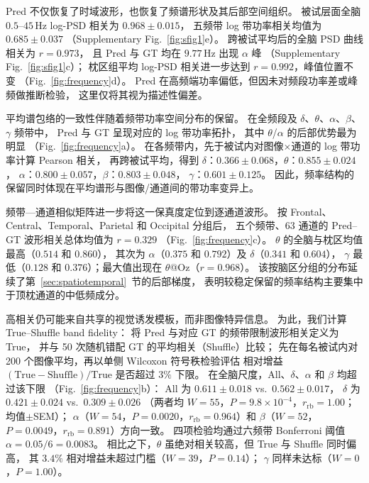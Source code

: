 \documentclass[a4paper,11pt]{article}
\begin{document}
Pred 不仅恢复了时域波形，也恢复了频谱形状及其后部空间组织。
被试层面全脑 $0.5$--$45\,\mathrm{Hz}$ log-PSD 相关为 $0.968\pm0.015$，
五频带 log 带功率相关均值为 $0.685\pm0.037$
（Supplementary Fig.~\ref{fig:sfig1}e）。
跨被试平均后的全脑 PSD 曲线相关为 $r=0.973$，
且 Pred 与 GT 均在 $9.77\,\mathrm{Hz}$ 出现 $\alpha$ 峰
（Supplementary Fig.~\ref{fig:sfig1}c）；
枕区组平均 log-PSD 相关进一步达到 $r=0.992$，峰值位置不变
（Fig.~\ref{fig:frequency}d）。
Pred 在高频端功率偏低，但因未对频段功率差或峰频做推断检验，
这里仅将其视为描述性偏差。

平均谱包络的一致性伴随着频带功率空间分布的保留。
在全频段及 $\delta$、$\theta$、$\alpha$、$\beta$、$\gamma$ 频带中，
Pred 与 GT 呈现对应的 log 带功率拓扑，
其中 $\theta$/$\alpha$ 的后部优势最为明显
（Fig.~\ref{fig:frequency}a）。
在各频带内，先于被试内对图像$\times$通道的 log 带功率计算 Pearson 相关，
再跨被试平均，得到
$\delta$：$0.366\pm0.068$，$\theta$：$0.855\pm0.024$，
$\alpha$：$0.800\pm0.057$，$\beta$：$0.803\pm0.048$，
$\gamma$：$0.601\pm0.125$。
因此，频率结构的保留同时体现在平均谱形与图像/通道间的带功率变异上。

频带—通道相似矩阵进一步将这一保真度定位到逐通道波形。
按 Frontal、Central、Temporal、Parietal 和 Occipital 分组后，
五个频带、63 通道的 Pred--GT 波形相关总体均值为 $r=0.329$
（Fig.~\ref{fig:frequency}c）。
$\theta$ 的全脑与枕区均值最高（$0.514$ 和 $0.860$），
其次为 $\alpha$（$0.375$ 和 $0.792$）及 $\delta$（$0.341$ 和 $0.604$），
$\gamma$ 最低（$0.128$ 和 $0.376$）；最大值出现在 $\theta$@Oz（$r=0.968$）。
该按脑区分组的分布延续了第~\ref{sec:spatiotemporal}~节的后部梯度，
表明较稳定保留的频率结构主要集中于顶枕通道的中低频成分。

高相关仍可能来自共享的视觉诱发模板，而非图像特异信息。
为此，我们计算 True--Shuffle band fidelity：
将 Pred 与对应 GT 的频带限制波形相关定义为 True，
并与 50 次随机错配 GT 的平均相关（Shuffle）比较；
先在每名被试内对 200 个图像平均，再以单侧 Wilcoxon 符号秩检验评估
相对增益 $(\mathrm{True}-\mathrm{Shuffle})/\mathrm{True}$ 是否超过 $3\%$ 下限。
在全脑尺度，All、$\delta$、$\alpha$ 和 $\beta$ 均超过该下限
（Fig.~\ref{fig:frequency}b）：
All 为 $0.611\pm0.018$ vs.\ $0.562\pm0.017$，
$\delta$ 为 $0.421\pm0.024$ vs.\ $0.309\pm0.026$
（两者均 $W=55$，$P=9.8\times10^{-4}$，$r_{\mathrm{rb}}=1.00$；均值$\pm$SEM）；
$\alpha$（$W=54$，$P=0.0020$，$r_{\mathrm{rb}}=0.964$）和
$\beta$（$W=52$，$P=0.0049$，$r_{\mathrm{rb}}=0.891$）方向一致。
四项检验均通过六频带 Bonferroni 阈值 $\alpha=0.05/6=0.0083$。
相比之下，$\theta$ 虽绝对相关较高，但 True 与 Shuffle 同时偏高，
其 $3.4\%$ 相对增益未超过门槛（$W=39$，$P=0.14$）；
$\gamma$ 同样未达标（$W=0$，$P=1.00$）。
\end{document}

